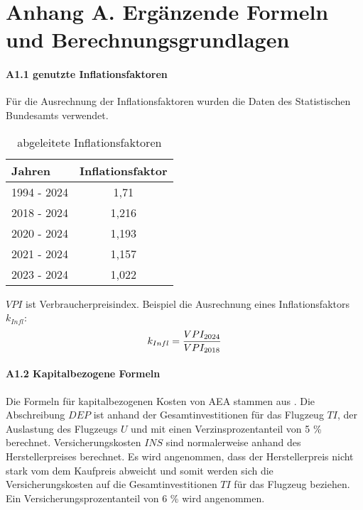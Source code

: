 \chapter{Anhang A. Ergänzende Formeln und Berechnungsgrundlagen}
\subsubsection{A1.1 genutzte Inflationsfaktoren}
Für die Ausrechnung der Inflationsfaktoren wurden die Daten des Statistischen Bundesamts verwendet. 
\begin{table}[h]
	\begin{center}
    \caption{abgeleitete Inflationsfaktoren}
	\label{Inflationsfaktoren}
	\begin{tabular}{|l|c|}
		\hline
		\textbf{Jahren} & \textbf{Inflationsfaktor} \\ \hline
		1994 - 2024 & 1,71 \\ \hline
		2018 - 2024 & 1,216 \\ \hline
		2020 - 2024 & 1,193 \\ \hline
        2021 - 2024 & 1,157 \\ \hline
        2023 - 2024 & 1,022 \\ \hline
	\end{tabular}
    \end{center}
\end{table}

$VPI$ ist Verbraucherpreisindex. Beispiel die Ausrechnung eines Inflationsfaktors $k_{Infl}$:
\begin{equation}
	{k_{Infl}} = \frac{VPI_{2024}}{VPI_{2018}} \\
	\label{inflation}
 \end{equation}

\subsubsection{A1.2 Kapitalbezogene Formeln}
Die Formeln für kapitalbezogenen Kosten von AEA stammen aus \cite{minwoo2019analysis}.
Die Abschreibung $DEP$ ist anhand der Gesamtinvestitionen für das Flugzeug $TI$, der Auslastung des Flugzeugs $U$
und mit einen Verzinsprozentanteil von 5 \% \cite{scholz_design_evaluation_doc} berechnet.
Versicherungskosten $INS$ sind normalerweise anhand des Herstellerpreises berechnet. 
Es wird angenommen, dass der Herstellerpreis nicht stark
vom dem Kaufpreis abweicht und somit werden sich die Versicherungskosten auf die Gesamtinvestitionen $TI$
für das Flugzeug beziehen. Ein Versicherungsprozentanteil von 6 \% wird angenommen.

